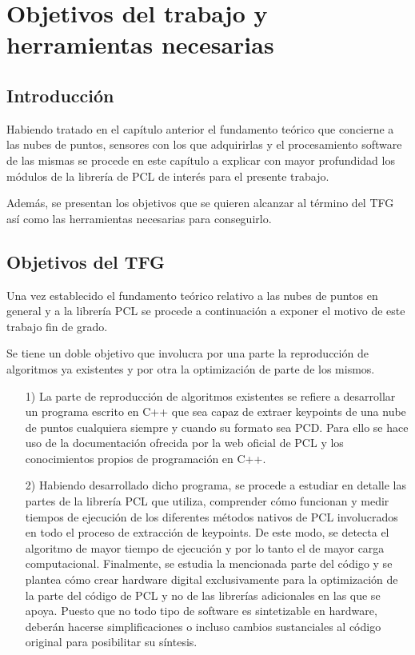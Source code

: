\chapter{Objetivos del trabajo y herramientas necesarias}

\section{Introducción}
Habiendo tratado en el capítulo anterior el fundamento teórico que concierne a las nubes de puntos, sensores con los que adquirirlas y el procesamiento software de las mismas se procede en este capítulo a explicar con mayor profundidad los módulos de la librería de PCL de interés para el presente trabajo.

Además, se presentan los objetivos que se quieren alcanzar al término del TFG así como las herramientas necesarias para conseguirlo.

\section{Objetivos del TFG}
Una vez establecido el fundamento teórico relativo a las nubes de puntos en general y a la librería PCL se procede a continuación a exponer el motivo de este trabajo fin de grado.

Se tiene un doble objetivo que involucra por una parte la reproducción de algoritmos ya existentes y por otra la optimización de parte de los mismos.
\begin{itemize}
\item[1)] La parte de reproducción de algoritmos existentes se refiere a desarrollar un programa escrito en C++ que sea capaz de extraer keypoints de una nube de puntos cualquiera siempre y cuando su formato sea PCD. Para ello se hace uso de la documentación ofrecida por la web oficial de PCL y los conocimientos propios de programación en C++. 
\item[2)] Habiendo desarrollado dicho programa, se procede a estudiar en detalle las partes de la librería PCL que utiliza, comprender cómo funcionan y medir tiempos de ejecución de los diferentes métodos nativos de PCL involucrados en todo el proceso de extracción de keypoints. De este modo, se detecta el algoritmo de mayor tiempo de ejecución y por lo tanto el de mayor carga computacional. Finalmente, se estudia la mencionada parte del código y se plantea cómo crear hardware digital exclusivamente para la optimización de la parte del código de PCL y no de las librerías adicionales en las que se apoya. Puesto que no todo tipo de software es sintetizable en hardware, deberán hacerse simplificaciones o incluso cambios sustanciales al código original para posibilitar su síntesis.
\end{itemize}


